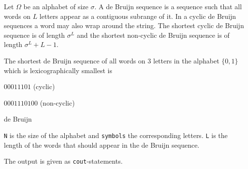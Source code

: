Let $\Omega$ be an alphabet of size $\sigma$. A de Bruijn sequence is
a sequence such that all words on $L$ letters appear as a contiguous
subrange of it. In a cyclic de Bruijn sequences a word may also wrap
around the string.  The shortest cyclic de Bruijn sequence is of
length $\sigma^L$ and the shortest non-cyclic de Bruijn sequence is of
length $\sigma^L+L-1$.

The shortest de Bruijn sequence of all words on $3$ letters in the
alphabet $\{0,1\}$ which is lexicographically smallest is

$00011101$ (cyclic)

$0001110100$ (non-cyclic)

\begin{algorithm}{de Bruijn}

\desc
{\tt N} is the size of the alphabet and {\tt symbols} the
corresponding letters. {\tt L} is the length of the words that should
appear in the de Bruijn sequence.

The output is given as {\tt cout}-statements.
\end{algorithm}
